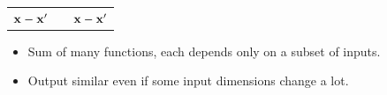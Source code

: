 {\begin{tabular}{ccc}
 ${\bf{x}} - {\bf{x}}'$ & & ${\bf{x}} - {\bf{x}}'$
\end{tabular}

\vspace{\baselineskip}
\begin{itemize}
	\item Sum of many functions, each depends only on a subset of inputs.
	\item Output similar even if some input dimensions change a lot.
\end{itemize}
}




